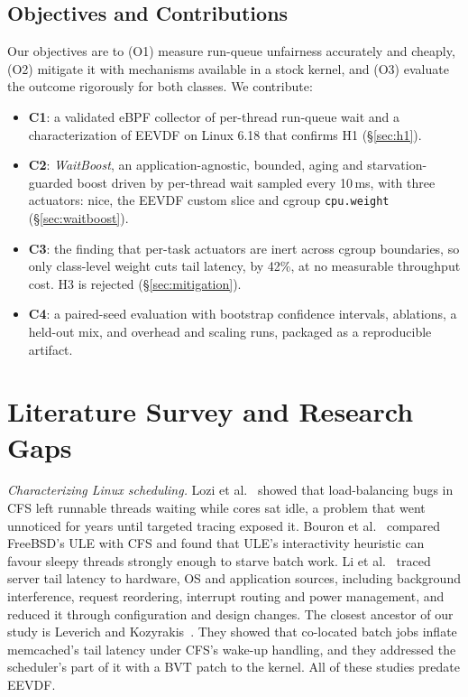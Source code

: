 \documentclass[conference]{IEEEtran}
\newcommand{\ms}{\,ms}
\newcommand{\cpuweight}{\texttt{cpu.weight}}
\begin{document}
\subsection{Objectives and Contributions}
Our objectives are to (O1) measure run-queue unfairness accurately and cheaply, (O2) mitigate it with mechanisms available in a stock kernel, and (O3) evaluate the outcome rigorously for both classes. We contribute:
\begin{itemize}
\item \textbf{C1}: a validated eBPF collector of per-thread run-queue wait and a characterization of EEVDF on Linux 6.18 that confirms H1 (\S\ref{sec:h1}).
\item \textbf{C2}: \emph{WaitBoost}, an application-agnostic, bounded, aging and starvation-guarded boost driven by per-thread wait sampled every 10\ms, with three actuators: nice, the EEVDF custom slice and cgroup \cpuweight{} (\S\ref{sec:waitboost}).
\item \textbf{C3}: the finding that per-task actuators are inert across cgroup boundaries, so only class-level weight cuts tail latency, by 42\%, at no measurable throughput cost. H3 is rejected (\S\ref{sec:mitigation}).
\item \textbf{C4}: a paired-seed evaluation with bootstrap confidence intervals, ablations, a held-out mix, and overhead and scaling runs, packaged as a reproducible artifact.
\end{itemize}

\section{Literature Survey and Research Gaps}

\textit{Characterizing Linux scheduling.} Lozi et al.~\cite{lozi2016wasted} showed that load-balancing bugs in CFS left runnable threads waiting while cores sat idle, a problem that went unnoticed for years until targeted tracing exposed it. Bouron et al.~\cite{bouron2018battle} compared FreeBSD's ULE with CFS and found that ULE's interactivity heuristic can favour sleepy threads strongly enough to starve batch work. Li et al.~\cite{li2014tales} traced server tail latency to hardware, OS and application sources, including background interference, request reordering, interrupt routing and power management, and reduced it through configuration and design changes. The closest ancestor of our study is Leverich and Kozyrakis~\cite{leverich2014reconciling}. They showed that co-located batch jobs inflate memcached's tail latency under CFS's wake-up handling, and they addressed the scheduler's part of it with a BVT patch to the kernel. All of these studies predate EEVDF.
\end{document}
